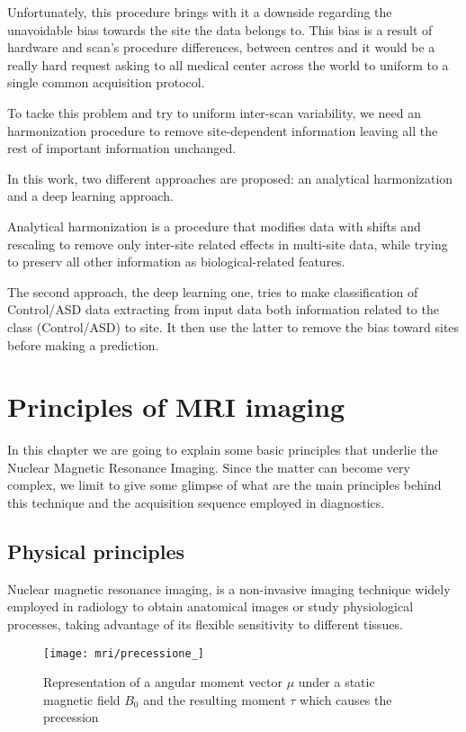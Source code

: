 \documentclass[10pt]{report}
\begin{document}
Unfortunately, this procedure brings with it a downside regarding the unavoidable bias towards the site the data belongs to.
This bias is a result of hardware and scan's procedure differences, between centres and it would be a really hard request asking to all medical center across the world to uniform to a single common acquisition protocol.

To tacke this problem and try to uniform inter-scan variability, we need an harmonization procedure to remove site-dependent information leaving all the rest of important information unchanged.

In this work, two different approaches are proposed: an analytical harmonization and a deep learning approach.

Analytical harmonization is a procedure that modifies data with shifts and rescaling to remove only inter-site related effects in multi-site data, while trying to preserv all other information as biological-related features.

The second approach, the deep learning one, tries to make classification of Control/ASD data extracting from input data both information related to the class (Control/ASD) to site. It then use the latter to remove the bias toward sites before making a prediction.


\chapter{Principles of MRI imaging}\label{sec:mri_introduction}
 In this chapter we are going to explain some basic principles that underlie the Nuclear Magnetic Resonance Imaging. Since the matter can become very complex, we limit to give some glimpse of what are the main principles behind this technique and the acquisition sequence employed in diagnostics.

\section{Physical principles}
Nuclear magnetic resonance imaging, is a non-invasive imaging technique widely employed in radiology to obtain anatomical images or study physiological processes, taking advantage of its flexible sensitivity to different tissues.

\begin{wrapfigure}[25]{l}{0.4\textwidth}
\centering
\texttt{[image: mri/precessione\_]}
\caption{Representation of a angular moment vector $\mu$ under a static magnetic field $B_0$ and the resulting moment $\tau$ which causes the precession}
\label{fig:precession}
\end{wrapfigure}
\end{document}
